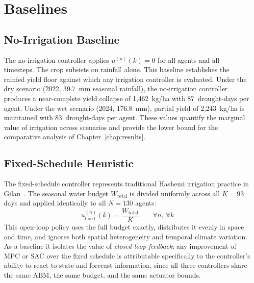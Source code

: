 \section{Baselines}
\label{sec:ctrl-baselines}

\subsection{No-Irrigation Baseline}
\label{ssec:ctrl-noirr}

The no-irrigation controller applies $u^{(n)}(k) = 0$ for all agents and all
timesteps. The crop subsists on rainfall alone. This baseline establishes the
rainfed yield floor against which any irrigation controller is evaluated.
Under the dry scenario (2022, 39.7~mm seasonal rainfall), the no-irrigation
controller produces a near-complete yield collapse of 1{,}462~kg/ha with
87~drought-days per agent. Under the wet scenario (2024, 176.8~mm), partial
yield of 2{,}243~kg/ha is maintained with 83~drought-days per agent. These
values quantify the marginal value of irrigation across scenarios and provide
the lower bound for the comparative analysis of Chapter~\ref{chap:results}.

\subsection{Fixed-Schedule Heuristic}
\label{ssec:ctrl-fixed}

The fixed-schedule controller represents traditional Hashemi irrigation
practice in Gilan~\cite{jalali2021}. The seasonal water budget
$W_{\mathrm{total}}$ is divided uniformly across all $K = 93$ days and
applied identically to all $N = 130$ agents:
\begin{equation}
u_{\mathrm{fixed}}^{(n)}(k) = \frac{W_{\mathrm{total}}}{K}
\qquad \forall n,\, \forall k
\label{eq:fixed-schedule}
\end{equation}
This open-loop policy uses the full budget exactly, distributes it evenly
in space and time, and ignores both spatial heterogeneity and temporal
climate variation. As a baseline it isolates the value of \emph{closed-loop
feedback}: any improvement of MPC or SAC over the fixed schedule is
attributable specifically to the controller's ability to react to state and
forecast information, since all three controllers share the same ABM, the
same budget, and the same actuator bounds.

